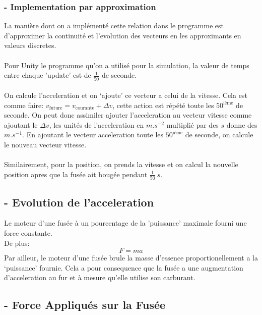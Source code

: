 \documentclass[a4paper, 12pt]{scrartcl}
\begin{document}
\subsubsection{- Implementation par approximation}
La manière dont on a implémenté cette relation dans le programme est d'approximer la 
continuité et l'evolution des vecteurs en les approximants en valeurs discretes. 
\\ \\ \indent
Pour Unity le programme qu'on a utilisé pour la simulation, la valeur de temps entre chaque 'update' est de $\frac{1}{50}$ de seconde. 
\\ \\ \indent
On calcule l'acceleration et on `ajoute' ce vecteur a celui de la vitesse. Cela est comme faire: $v_{\text{future}} = v_{\text{courante}} + \Delta v$, cette action est répété
toute les $50^{\text{ième}}$ de seconde. On peut donc assimiler ajouter l'acceleration au vecteur vitesse comme ajoutant le $\Delta v$, 
les unités de l'acceleration en $\si{m.s^{-2}}$ multiplié par des $\si{s}$ donne des $\si{m.s^{-1}}$. En ajoutant le vecteur acceleration toute les $50^{\text{ième}}$ de seconde, 
on calcule le nouveau vecteur vitesse. 
\\ \\ \indent 
Similairement, pour la position, on prends la vitesse et on calcul la nouvelle position apres que la fusée
ait bougée pendant $\frac{1}{50}\ \si{s}$.

\subsection{- Evolution de l'acceleration}
Le moteur d'une fusée à un pourcentage de la 'puissance' maximale fourni une force
constante. 
\\
De plus:
\[F = ma \]
\indent
Par ailleur, le moteur d'une fusée brule la masse d'essence proportionellement a la `puissance' fournie.
Cela a pour consequence que la fusée a une augmentation d'acceleration au fur et 
à mesure qu'elle utilise son carburant. 

\subsection{- Force Appliqués sur la Fusée}
\end{document}
